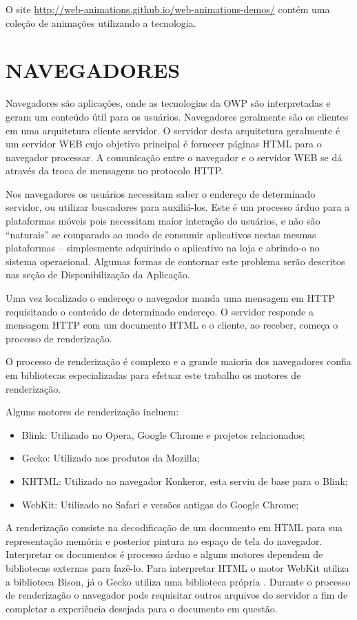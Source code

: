 O site \url{http://web-animations.github.io/web-animations-demos/} contém uma
coleção de animações utilizando a tecnologia.

\section{NAVEGADORES}
Navegadores são aplicações, onde as tecnologias da OWP são
interpretadas e geram um conteúdo útil para os usuários. Navegadores
geralmente são os clientes em uma arquitetura cliente servidor. O
servidor desta arquitetura geralmente é um servidor WEB cujo objetivo
principal é fornecer páginas HTML para o navegador processar. A
comunicação entre o navegador e o servidor WEB se dá através da troca de
mensagens no protocolo HTTP.

Nos navegadores os usuários necessitam saber o endereço de determinado
servidor, ou utilizar buscadores para auxiliá-los. Este é um processo
árduo para a plataformas móveis pois necessitam maior interação do
usuários, e não são “naturais” se comparado ao modo de consumir
aplicativos nestas mesmas plataformas – simplesmente adquirindo
o aplicativo na loja e abrindo-o no sistema operacional. Algumas
formas de contornar este problema serão descritos nas seção de
Disponibilização da Aplicação.

Uma vez localizado o endereço o navegador manda uma mensagem em HTTP
requisitando o conteúdo de determinado endereço. O servidor responde a
mensagem HTTP com um documento HTML e o cliente, ao receber, começa o
processo de renderização.

O processo de renderização é complexo e a grande maioria dos
navegadores confia em bibliotecas especializadas para efetuar este
trabalho os motores de renderização.

Alguns motores de renderização incluem:

\begin{itemize}
    \item Blink: Utilizado no Opera, Google Chrome e projetos relacionados;
    \item Gecko: Utilizado nos produtos da Mozilla;
    \item KHTML: Utilizado no navegador Konkeror, esta serviu de base para o Blink;
    \item WebKit: Utilizado no Safari e versões antigas do Google Chrome;
\end{itemize}

A renderização consiste na decodificação de um documento em HTML
para sua representação memória e posterior pintura no espaço de tela
do navegador. Interpretar os documentos é processo árduo e alguns
motores dependem de bibliotecas externas para fazê-lo. Para interpretar
HTML o motor WebKit utiliza a biblioteca Bison, já o Gecko utiliza uma
biblioteca própria \autocite{howBrowsersWork}. Durante o processo de
renderização o navegador pode requisitar outros arquivos do servidor a
fim de completar a experiência desejada para o documento em questão.

